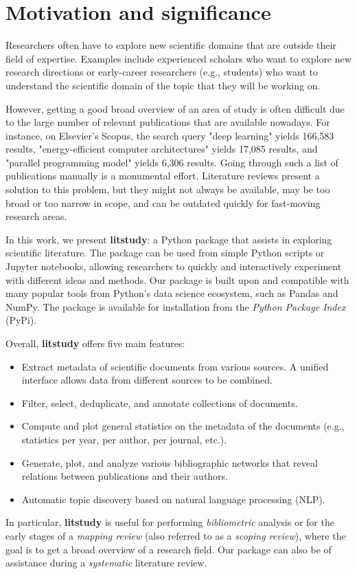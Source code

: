 \section{Motivation and significance}

Researchers often have to explore new scientific domains that are outside their field of expertise. Examples include experienced scholars who want to explore new research directions or early-career researchers (e.g., students) who want to understand the scientific domain of the topic that they will be working on.

However, getting a good broad overview of an area of study is often difficult due to the large number of relevant publications that are available nowadays. For instance, on Elsevier's Scopus, the search query "deep learning" yields 166,583 results, "energy-efficient computer architectures" yields 17,085 results, and "parallel programming model" yields 6,306 results. Going through such a list of publications manually is a monumental effort. Literature reviews present a solution to this problem, but they might not always be available, may be too broad or too narrow in scope, and can be outdated quickly for fast-moving research areas.

In this work, we present \textbf{litstudy}: a Python package that assists in exploring scientific literature. The package can be used from simple Python scripts or Jupyter notebooks, allowing researchers to quickly and interactively experiment with different ideas and methods. Our package is built upon and compatible with many popular tools from Python's data science ecosystem, such as Pandas and NumPy. The package is available for installation from the \textit{Python Package Index} (PyPi).

Overall, \textbf{litstudy} offers five main features:

\begin{itemize}
\item Extract metadata of scientific documents from various sources. A unified interface allows data from different sources to be combined.
\item Filter, select, deduplicate, and annotate collections of documents.
\item Compute and plot general statistics on the metadata of the documents (e.g., statistics per year, per author, per journal, etc.).
\item Generate, plot, and analyze various bibliographic networks that reveal relations between publications and their authors.
\item Automatic topic discovery based on natural language processing (NLP).
\end{itemize}

In particular, \textbf{litstudy} is useful for performing \textit{bibliometric} analysis or for the early stages of a \textit{mapping review} (also referred to as a \textit{scoping review}), where the goal is to get a broad overview of a research field. Our package can also be of assistance during a \textit{systematic} literature review.
